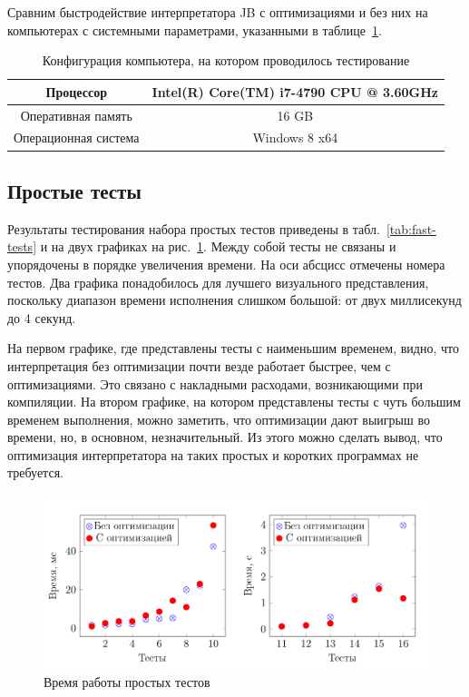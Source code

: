 \documentclass[14pt]{extarticle}
\begin{document}
	Сравним быстродействие интерпретатора JB с оптимизациями и без них на компьютерах с системными параметрами, указанными в таблице~\ref{tab:config}.\\



	\begin{table}[h]
		\begin{center}
			\begin{tabular}{|c|c|}
				\hline Процессор & Intel(R) Core(TM) i7-4790 CPU @ 3.60GHz  \\
				\hline Оперативная память & 16 GB \\
				\hline Операционная система & Windows 8 x64 \\
				\hline 
			\end{tabular}
		\end{center}
		\caption{\label{tab:config}Конфигурация компьютера, на котором проводилось тестирование}
	\end{table}
	\subsection*{Простые тесты}
	Результаты тестирования набора простых тестов приведены в табл.~\ref{tab:fast-tests} и на двух графиках на рис.~\ref{graphic: fast}. Между собой тесты не связаны и упорядочены в порядке увеличения времени. На оси абсцисс отмечены номера тестов. Два графика понадобилось для лучшего визуального представления, поскольку диапазон времени исполнения слишком большой: от двух миллисекунд до 4 секунд.
	
	На первом графике, где представлены тесты с наименьшим временем, видно, что интерпретация без оптимизации почти везде работает быстрее, чем с оптимизациями. Это связано с накладными расходами, возникающими при компиляции. На втором графике, на котором представлены тесты с чуть большим временем выполнения, можно заметить, что оптимизации дают выигрыш во времени, но, в основном, незначительный. Из этого можно сделать вывод, что оптимизация интерпретатора на таких простых и коротких программах не требуется.\\
\newcommand{\comma}[0]{,}
		\begin{figure} [h]
			\includegraphics[width=\linewidth]{FastTests.png}
			\caption{Время работы простых тестов}\label{graphic: fast}
		\end{figure}
		\iffalse
\end{document}
